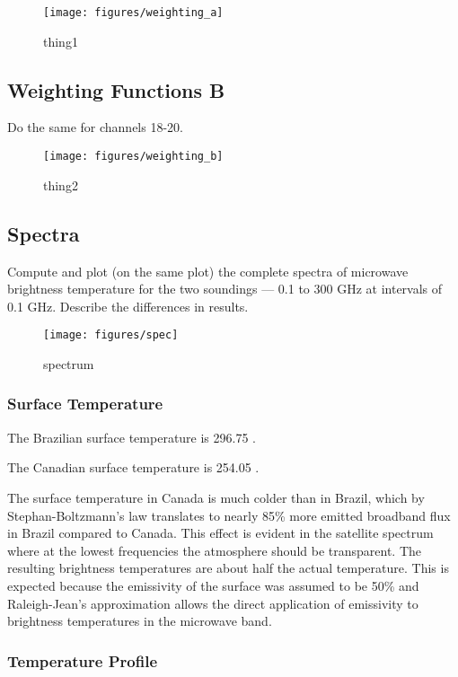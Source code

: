 \documentclass[twocol]{ametsoc}
\begin{document}
\begin{figure}
	\centering
	\texttt{[image: figures/weighting\_a]}
	\caption{thing1}
	\label{fig:weighting_a}
\end{figure}

\subsection{Weighting Functions B}
Do the same for channels 18-20.

\begin{figure}
	\centering
	\texttt{[image: figures/weighting\_b]}
	\caption{thing2}
	\label{fig:weighting_b}
\end{figure}

\subsection{Spectra}
Compute and plot (on the same plot) the complete spectra of microwave brightness temperature for the two soundings — 0.1 to 300 GHz at intervals of 0.1 GHz.   Describe the differences in results.


\begin{figure}
	\centering
	\texttt{[image: figures/spec]}
	\caption{spectrum}
	\label{fig:spec}
\end{figure}

\subsubsection{Surface Temperature}

The Brazilian surface temperature is 296.75 .

The Canadian surface temperature is 254.05 .

The surface temperature in Canada is much colder than in Brazil, which by Stephan-Boltzmann's law translates to nearly 85\% more emitted broadband flux in Brazil compared to Canada.
This effect is evident in the satellite spectrum where at the lowest frequencies the atmosphere should be transparent.
The resulting brightness temperatures are about half the actual temperature.
This is expected because the emissivity of the surface was assumed to be 50\% and Raleigh-Jean's approximation allows the direct application of emissivity to brightness temperatures in the microwave band.

\subsubsection{Temperature Profile}
\end{document}

